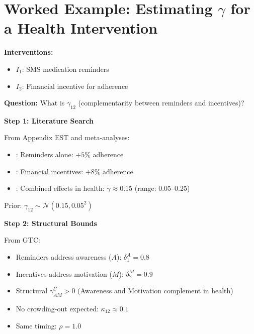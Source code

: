 \section{Worked Example: Estimating $\gamma$ for a Health Intervention}
\label{sec:worked-example}

\begin{tcolorbox}[colback=blue!5!white,colframe=blue!75!black,title=\textbf{Case: MediCare Medication Adherence Program}]
\textbf{Interventions:}
\begin{itemize}[noitemsep]
    \item $I_1$: SMS medication reminders
    \item $I_2$: Financial incentive for adherence
\end{itemize}

\textbf{Question:} What is $\gamma_{12}$ (complementarity between reminders and incentives)?
\end{tcolorbox}

\textbf{Step 1: Literature Search}

From Appendix EST and meta-analyses:
\begin{itemize}
    \item \citet{karlan2011}: Reminders alone: $+5\%$ adherence
    \item \citet{thaler2004}: Financial incentives: $+8\%$ adherence
    \item \citet{volpp2008}: Combined effects in health: $\gamma \approx 0.15$ (range: 0.05–0.25)
\end{itemize}

Prior: $\gamma_{12} \sim \mathcal{N}(0.15, 0.05^2)$

\textbf{Step 2: Structural Bounds}

From GTC:
\begin{itemize}
    \item Reminders address awareness ($A$): $\delta_1^A = 0.8$
    \item Incentives address motivation ($M$): $\delta_2^M = 0.9$
    \item Structural $\gamma^U_{AM} > 0$ (Awareness and Motivation complement in health)
    \item No crowding-out expected: $\kappa_{12} \approx 0.1$
    \item Same timing: $\rho = 1.0$
\end{itemize}

